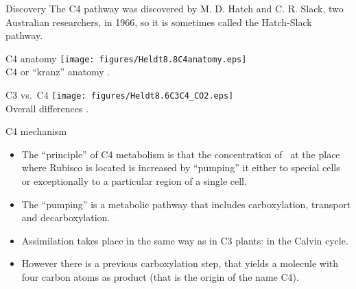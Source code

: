 \documentclass[10pt]{beamer}
\begin{document}
\begin{frame}{Discovery}
    The C4 pathway was discovered by M. D. Hatch and C. R. Slack, two
    Australian researchers, in 1966, so it is sometimes called the
    Hatch-Slack pathway.
\end{frame}

%
\begin{frame}{C4 anatomy}
    \centering
    \texttt{[image: figures/Heldt8.8C4anatomy.eps]}\\
    {\small C4 or ``kranz'' anatomy \autocite[from][]{Heldt1997}.}
\end{frame}

\begin{frame}{C3 vs.\ C4}
    \centering
    \texttt{[image: figures/Heldt8.6C3C4\_CO2.eps]}\\
    {\small Overall differences \autocite[from][]{Heldt1997}.}
\end{frame}

\begin{frame}{C4 mechanism}
   \begin{itemize}
        \item The ``principle'' of C4 metabolism is that the
        concentration of \COtwo\ at the place where Rubisco is
        located is increased by ``pumping'' it either to special
        cells or exceptionally to a particular region of a single
        cell.
        \item The ``pumping'' is a metabolic pathway that includes
        carboxylation, transport and decarboxylation.
        \item Assimilation takes place in the same way as in C3
        plants: in the Calvin cycle.
        \item However there is a previous carboxylation step, that
        yields a molecule with four carbon atoms as product (that is
        the origin of the name C4).
    \end{itemize}
\end{frame}
\end{document}
